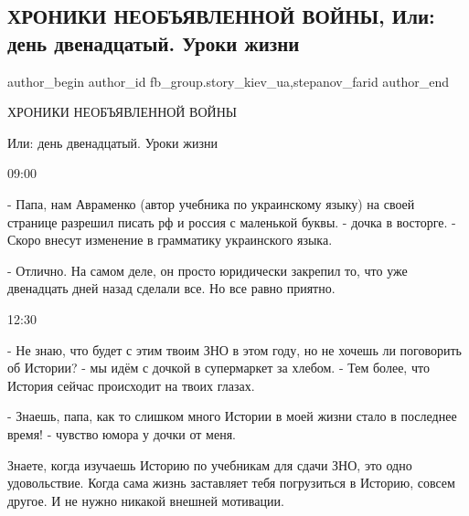  
 
 
 
 
 
\subsection{ХРОНИКИ НЕОБЪЯВЛЕННОЙ ВОЙНЫ, Или: день двенадцатый. Уроки жизни}
\label{sec:11_03_2022.fb.fb_group.story_kiev_ua.1.hroniki}
 
\ifcmt
 author_begin
   author_id fb_group.story_kiev_ua,stepanov_farid
 author_end
\fi

ХРОНИКИ НЕОБЪЯВЛЕННОЙ ВОЙНЫ

Или: день двенадцатый. Уроки жизни

09:00


- Папа, нам Авраменко (автор учебника по украинскому языку) на своей странице
разрешил писать рф и россия с маленькой буквы. - дочка в восторге. - Скоро
внесут изменение в грамматику украинского языка.

- Отлично. На самом деле, он просто юридически закрепил то, что уже двенадцать
дней назад сделали все. Но все равно приятно.

12:30

- Не знаю, что будет с этим твоим ЗНО в этом году, но не хочешь ли поговорить
об Истории? - мы идём с дочкой в супермаркет за хлебом. - Тем более, что
История сейчас происходит на твоих глазах.

- Знаешь, папа, как то слишком много Истории в моей жизни стало в последнее
время! - чувство юмора у дочки от меня.

Знаете, когда изучаешь Историю по учебникам для сдачи ЗНО, это одно
удовольствие. Когда сама жизнь заставляет тебя погрузиться в Историю, совсем
другое. И не нужно никакой внешней мотивации.

